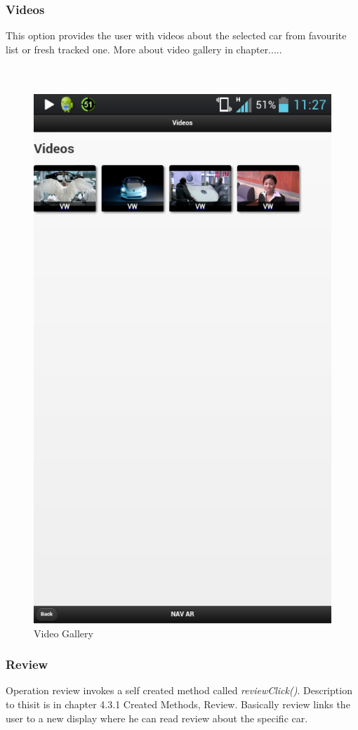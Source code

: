 \subsubsection{Videos}
This option provides the user with videos about the selected car from favourite list or fresh tracked one. More about video gallery in chapter.....
\\\\\\
\begin{figure}[h]
\centering
\includegraphics[width=0.5\linewidth]{graphics/chapter4/8}
\caption{Video Gallery}
\end{figure}
\newpage

\subsubsection{Review}
Operation review invokes a self created method called \textit{reviewClick()}. Description to thisit is in chapter 4.3.1 Created Methods, Review. Basically review links the user to a new display where he can read review about the specific car.
\\\\\\

